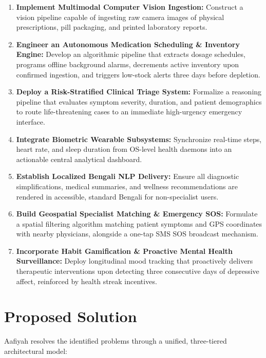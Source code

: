\documentclass[12pt,a4paper,oneside]{report}
\begin{document}
\begin{enumerate}
    \item \textbf{Implement Multimodal Computer Vision Ingestion:} Construct a vision pipeline capable of ingesting raw camera images of physical prescriptions, pill packaging, and printed laboratory reports.
    \item \textbf{Engineer an Autonomous Medication Scheduling \& Inventory Engine:} Develop an algorithmic pipeline that extracts dosage schedules, programs offline background alarms, decrements active inventory upon confirmed ingestion, and triggers low-stock alerts three days before depletion.
    \item \textbf{Deploy a Risk-Stratified Clinical Triage System:} Formalize a reasoning pipeline that evaluates symptom severity, duration, and patient demographics to route life-threatening cases to an immediate high-urgency emergency interface.
    \item \textbf{Integrate Biometric Wearable Subsystems:} Synchronize real-time steps, heart rate, and sleep duration from OS-level health daemons into an actionable central analytical dashboard.
    \item \textbf{Establish Localized Bengali NLP Delivery:} Ensure all diagnostic simplifications, medical summaries, and wellness recommendations are rendered in accessible, standard Bengali for non-specialist users.
    \item \textbf{Build Geospatial Specialist Matching \& Emergency SOS:} Formulate a spatial filtering algorithm matching patient symptoms and GPS coordinates with nearby physicians, alongside a one-tap SMS SOS broadcast mechanism.
    \item \textbf{Incorporate Habit Gamification \& Proactive Mental Health Surveillance:} Deploy longitudinal mood tracking that proactively delivers therapeutic interventions upon detecting three consecutive days of depressive affect, reinforced by health streak incentives.
\end{enumerate}

\chapter{Proposed Solution}

Aafiyah resolves the identified problems through a unified, three-tiered architectural model:
\end{document}
